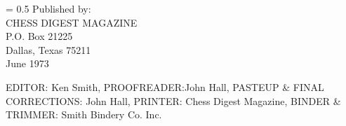 \drop = 0.5\textheight
\Centering
\vspace*{\drop}
Published by:\\
CHESS DIGEST MAGAZINE \\
P.O. Box 21225 \\
Dallas, Texas 75211 \\
June 1973 \par
\vfill
\RaggedRight
EDITOR: Ken Smith,
PROOFREADER:John Hall,
PASTEUP \& FINAL CORRECTIONS: John Hall,
PRINTER: Chess Digest Magazine,
BINDER \& TRIMMER: Smith Bindery Co. Inc. 